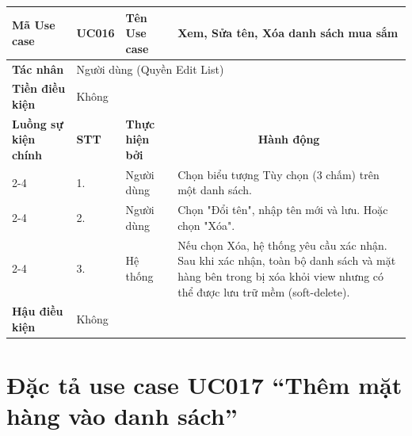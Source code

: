 \begin{longtable}{|p{2.7cm}|p{0.8cm}|p{2.6cm}|p{7.3cm}|}
\hline
\cellcolor[HTML]{D5F5E3}\textbf{Mã Use case} & \multicolumn{1}{l|}{UC016} & \cellcolor[HTML]{D5F5E3}\textbf{Tên Use case} & Xem, Sửa tên, Xóa danh sách mua sắm \\ \hline
\cellcolor[HTML]{D5F5E3}\textbf{Tác nhân} & \multicolumn{3}{p{10.7cm}|}{Người dùng (Quyền Edit List)} \\ \hline
\cellcolor[HTML]{D5F5E3}\textbf{Tiền điều kiện} & \multicolumn{3}{p{10.7cm}|}{Không} \\ \hline

\cellcolor[HTML]{D5F5E3}\textbf{Luồng sự kiện chính} & \cellcolor[HTML]{FDEBD0}\textbf{STT} & \cellcolor[HTML]{FDEBD0}\textbf{Thực hiện bởi} & \multicolumn{1}{c|}{\cellcolor[HTML]{FDEBD0}\textbf{Hành động}} \\ \cline{2-4} 
\cellcolor[HTML]{D5F5E3} & 1. & Người dùng & Chọn biểu tượng Tùy chọn (3 chấm) trên một danh sách. \\ \cline{2-4} 
\cellcolor[HTML]{D5F5E3} & 2. & Người dùng & Chọn "Đổi tên", nhập tên mới và lưu. Hoặc chọn "Xóa". \\ \cline{2-4} 
\cellcolor[HTML]{D5F5E3} & 3. & Hệ thống & Nếu chọn Xóa, hệ thống yêu cầu xác nhận. Sau khi xác nhận, toàn bộ danh sách và mặt hàng bên trong bị xóa khỏi view nhưng có thể được lưu trữ mềm (soft-delete). \\ \hline

\cellcolor[HTML]{D5F5E3}\textbf{Hậu điều kiện} & \multicolumn{3}{p{10.7cm}|}{Không} \\ \hline
\end{longtable}
\endgroup

\section{Đặc tả use case UC017 ``Thêm mặt hàng vào danh sách''}
\vspace{0.5cm}

\begingroup
\renewcommand{\arraystretch}{1.5}

